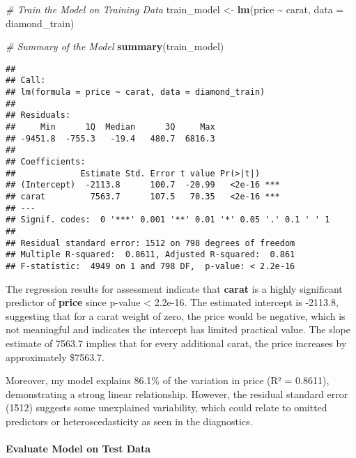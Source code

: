 \documentclass[
]{article}
\newenvironment{Shaded}{\begin{snugshade}}{\end{snugshade}}
\newcommand{\AttributeTok}[1]{\textcolor[rgb]{0.13,0.29,0.53}{#1}}
\newcommand{\CommentTok}[1]{\textcolor[rgb]{0.56,0.35,0.01}{\textit{#1}}}
\newcommand{\FunctionTok}[1]{\textcolor[rgb]{0.13,0.29,0.53}{\textbf{#1}}}
\newcommand{\NormalTok}[1]{#1}
\newcommand{\OtherTok}[1]{\textcolor[rgb]{0.56,0.35,0.01}{#1}}
\newcommand{\SpecialCharTok}[1]{\textcolor[rgb]{0.81,0.36,0.00}{\textbf{#1}}}
\begin{document}
\begin{Shaded}
\begin{Highlighting}[]
\CommentTok{\# Train the Model on Training Data}
\NormalTok{train\_model }\OtherTok{\textless{}{-}} \FunctionTok{lm}\NormalTok{(price }\SpecialCharTok{\textasciitilde{}}\NormalTok{ carat, }\AttributeTok{data =}\NormalTok{ diamond\_train)}

\CommentTok{\# Summary of the Model}
\FunctionTok{summary}\NormalTok{(train\_model)}
\end{Highlighting}
\end{Shaded}

\begin{verbatim}
## 
## Call:
## lm(formula = price ~ carat, data = diamond_train)
## 
## Residuals:
##     Min      1Q  Median      3Q     Max 
## -9451.8  -755.3   -19.4   480.7  6816.3 
## 
## Coefficients:
##             Estimate Std. Error t value Pr(>|t|)    
## (Intercept)  -2113.8      100.7  -20.99   <2e-16 ***
## carat         7563.7      107.5   70.35   <2e-16 ***
## ---
## Signif. codes:  0 '***' 0.001 '**' 0.01 '*' 0.05 '.' 0.1 ' ' 1
## 
## Residual standard error: 1512 on 798 degrees of freedom
## Multiple R-squared:  0.8611, Adjusted R-squared:  0.861 
## F-statistic:  4949 on 1 and 798 DF,  p-value: < 2.2e-16
\end{verbatim}

The regression results for assessment indicate that \textbf{carat} is a
highly significant predictor of \textbf{price} since p-value \textless{}
2.2e-16. The estimated intercept is -2113.8, suggesting that for a carat
weight of zero, the price would be negative, which is not meaningful and
indicates the intercept has limited practical value. The slope estimate
of 7563.7 implies that for every additional carat, the price increases
by approximately \$7563.7.

Moreover, my model explains 86.1\% of the variation in price (R² =
0.8611), demonstrating a strong linear relationship. However, the
residual standard error (1512) suggests some unexplained variability,
which could relate to omitted predictors or heteroscedasticity as seen
in the diagnostics.

\paragraph{Evaluate Model on Test
Data}\label{evaluate-model-on-test-data}
\end{document}
